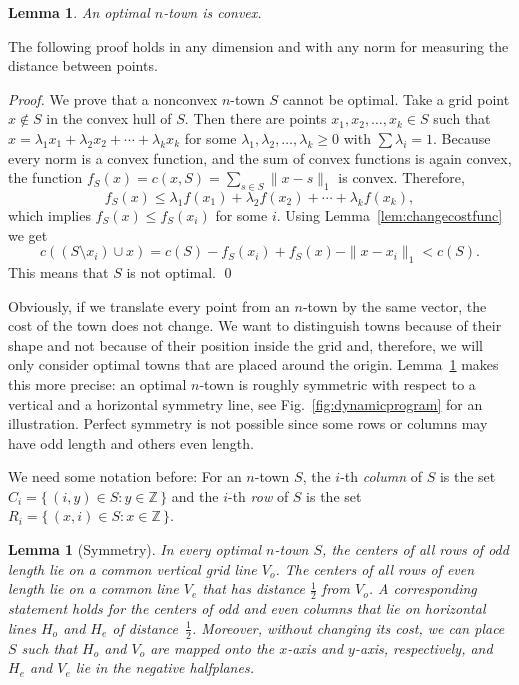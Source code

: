 \documentclass[preprint,authoryear,12pt]{elsarticle}
\newtheorem{lemma}[theorem]{Lemma}
\begin{document}
\begin{lemma}\label{lem:convex}
An optimal $n$-town is convex.
\end{lemma}


The following proof holds in any dimension and with any norm for measuring
the distance between points.
\begin{proof}
We prove that a nonconvex $n$-town $S$ cannot be optimal.
Take a grid point $x \notin S$ in the convex hull of $S$.
Then there are points $x_1,x_2,\ldots,x_k \in S$ such that
$x =\lambda_1 x_1 + \lambda_2 x_2 +\cdots + \lambda_k x_k$ for some
$\lambda_1, \lambda_2,\ldots, \lambda_k \ge 0$ with $\sum \lambda_i
= 1$. Because every norm is a convex function, and the sum of convex
functions is again convex, the function $f_S(x)=c(x,S)=\sum_{s \in
S} \|x-s\|_1$ is convex. Therefore, $$f_S(x) \le \lambda_1 f(x_1) +
\lambda_2 f(x_2)+\cdots + \lambda_k f(x_k),$$ which implies $f_S(x)
\le f_S(x_i)$ for some $i$. Using Lemma~\ref{lem:changecostfunc} we
get
$$c((S\setminus x_i) \cup x) = c(S) - f_S(x_i) + f_S(x) - \|x-x_i\|_1
<c(S).$$
This means that $S$ is not optimal.
\qed
\end{proof}


Obviously, if we translate every point from an $n$-town by the same
vector, the cost of the town does not change. We want to distinguish
towns because of their shape and not because of their position
inside the grid and, therefore, we will only consider optimal towns
that are placed around the origin. Lemma~\ref{lem:symmetry} makes
this more precise:
an optimal $n$-town is roughly
symmetric with respect to a vertical and a horizontal symmetry line,
see Fig.~\ref{fig:dynamicprogram} for an illustration.
Perfect symmetry is not possible
since some rows or columns may have odd length and others even length.

We need some notation before: For an $n$-town
$S$, the $i$-th \emph{column} of $S$ is the set $C_i= \{\, (i,y) \in S
: y \in \mathbb{Z}\,\}$ and the $i$-th \emph{row} of $S$ is the set
$R_i= \{\, (x,i) \in S : x \in \mathbb{Z}\,\}$.


\begin{lemma}[Symmetry]
\label{lem:symmetry}
In every optimal $n$-town $S$, the centers of all rows of odd length
lie on a common vertical grid line $V_o$. The centers of all rows of even
length lie on a common line $V_e$ that has distance $\frac12$ from
$V_o$. A corresponding statement holds for the centers of odd and
even columns that lie on horizontal lines $H_o$ and $H_e$ of
distance~$\frac12$. Moreover, without changing its cost, we can
place $S$ such that $H_o$ and $V_o$ are mapped onto the $x$-axis and
$y$-axis, respectively, and $H_e$ and $V_e$ lie in the negative
halfplanes.
\end{lemma}
\end{document}
